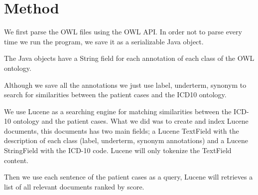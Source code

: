 \chapter{Method}
\label{cha:method}

%
%

We first parse the OWL files using the OWL API. In order not to parse every time
we run the program, we save it as a serializable Java object.

The Java objects have a String field for each annotation of each class of the
OWL ontology.


Although we save all the annotations we just use label, underterm, synonym to
search for similarities between the patient cases and the ICD10 ontology.


We use Lucene as a searching engine for matching similarities between the ICD-10
ontology and the patient cases. What we did was to create and index Lucene
documents, this documents has two main fields; a Lucene TextField with the
description of each class (label, underterm, synonym annotations) and a Lucene
StringField with the ICD-10 code. Lucene will only tokenize the TextField
content.

Then we use each sentence of the patient cases as a query, Lucene will retrieves
a list of all relevant documents ranked by score.



